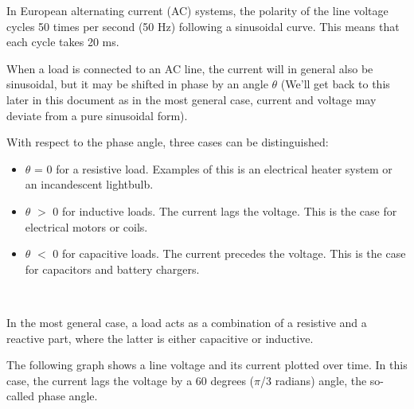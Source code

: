 \documentclass[a4paper]{article}
\begin{document}
In European alternating current (AC) systems, the polarity of the line
voltage cycles 50 times per second (50 Hz) following a sinusoidal curve.
This means that each cycle takes 20 ms.

When a load is connected to an AC line, the current will in general also
be sinusoidal, but it may be shifted in phase by an angle $\theta$ (We'll
get back to this later in this document as in the most general case,
current and voltage may deviate from a pure sinusoidal form).

With respect to the phase angle, three cases can be distinguished:

\begin{itemize}
	\item $\theta$ = 0 for a resistive load. Examples of this is an electrical heater system or an incandescent lightbulb.
	\item $\theta$ $>$ 0 for inductive loads. The current lags the voltage. This is the case for electrical motors or coils.
	\item  $\theta$ $<$ 0 for capacitive loads. The current precedes the voltage. This is the case for capacitors and battery chargers.
\end{itemize}\

In the most general case, a load acts as a combination of a resistive
and a reactive part, where the latter is either capacitive or inductive.

The following graph shows a line voltage and its current plotted over time. In
this case, the current lags the voltage by a 60 degrees ($\pi$/3 radians) angle,
the so-called phase angle.

\vspace{20pt}

\end{document}
